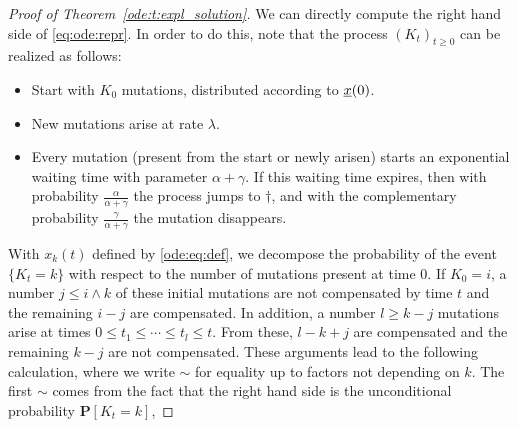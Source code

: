 \begin{proof}[Proof of Theorem~\ref{ode:t:expl_solution}]
We can directly compute the right hand side of \eqref{eq:ode:repr}. In order to do this, note that
the process $(K_t)_{t\geq 0}$ can be realized as follows: 
\begin{itemize}
\item Start with $K_0$ mutations, distributed according to
  $ \underline{x} \! \left( 0 \right) $.
\item New mutations arise at rate $\lambda$. 
\item Every mutation (present from the start or newly arisen) starts
  an exponential waiting time with parameter $\alpha+\gamma$. If this
  waiting time expires, then with probability
  $\frac{\alpha}{\alpha+\gamma}$ the process jumps to $\dagger$, and
  with the complementary probability $\frac{\gamma}{\alpha+\gamma}$
  the mutation disappears.
\end{itemize}
With $x_k(t)$ defined by \eqref{ode:eq:def}, we decompose the
probability of the event $\{K_t = k\}$ with respect to the number of
mutations present at time $0$. If $K_0=i$, a number $j\leq i \wedge k$
of these initial mutations are not compensated by time $t$ and the
remaining $i-j$ are compensated. In addition, a number $l\geq k-j$
mutations arise at times $0\leq t_1\leq \cdots \leq t_{l}\leq t$. From
these, $l-k+j$ are compensated and the remaining $k-j$ are not
compensated. These arguments lead to the following calculation, where
we write $\sim$ for equality up to factors not depending on $k$. The
first $\sim$ comes from the fact that the right hand side is the
unconditional probability $\mathbf P[K_t=k]$,


\end{proof}

